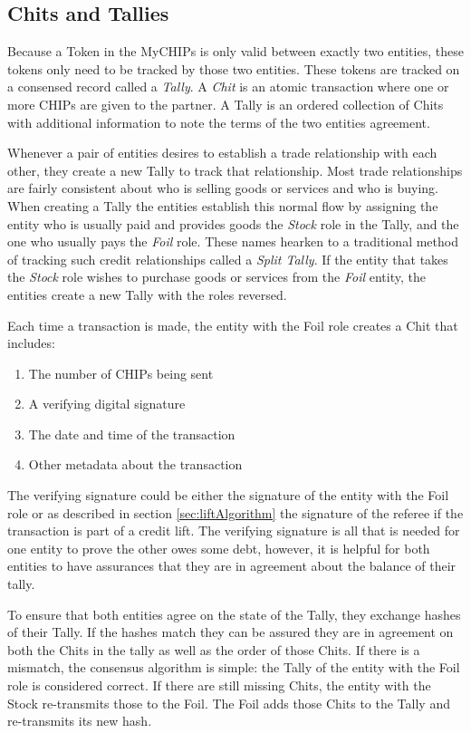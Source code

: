 \documentclass[runningheads]{llncs}
\begin{document}
\subsection{Chits and Tallies}
Because a Token in the MyCHIPs is only valid between exactly two entities, these tokens only need to be tracked by those two entities. These tokens are tracked on a consensed record called a \emph{Tally}. A \emph{Chit} is an atomic transaction where one or more CHIPs are given to the partner. A Tally is an ordered collection of Chits with additional information to note the terms of the two entities agreement. 

Whenever a pair of entities desires to establish a trade relationship with each other, they create a new Tally to track that relationship. Most trade relationships are fairly consistent about who is selling goods or services and who is buying. When creating a Tally the entities establish this normal flow by assigning the entity who is usually paid and provides goods the \emph{Stock} role in the Tally, and the one who usually pays the \emph{Foil} role. These names hearken to a traditional method of tracking such credit relationships called a \emph{Split Tally}. If the entity that takes the \emph{Stock} role wishes to purchase goods or services from the \emph{Foil} entity, the entities create a new Tally with the roles reversed.

Each time a transaction is made, the entity with the Foil role creates a Chit that includes: 
\begin{enumerate}
    \item The number of CHIPs being sent
    \item A verifying digital signature
    \item The date and time of the transaction
    \item Other metadata about the transaction
\end{enumerate}
The verifying signature could be either the signature of the entity with the Foil role or as described in section \ref{sec:liftAlgorithm} the signature of the referee if the transaction is part of a credit lift. The verifying signature is all that is needed for one entity to prove the other owes some debt, however, it is helpful for both entities to have assurances that they are in agreement about the balance of their tally. 

To ensure that both entities agree on the state of the Tally, they exchange hashes of their Tally. If the hashes match they can be assured they are in agreement on both the Chits in the tally as well as the order of those Chits. If there is a mismatch, the consensus algorithm is simple: the Tally of the entity with the Foil role is considered correct. If there are still missing Chits, the entity with the Stock re-transmits those to the Foil. The Foil adds those Chits to the Tally and re-transmits its new hash. 
\end{document}
